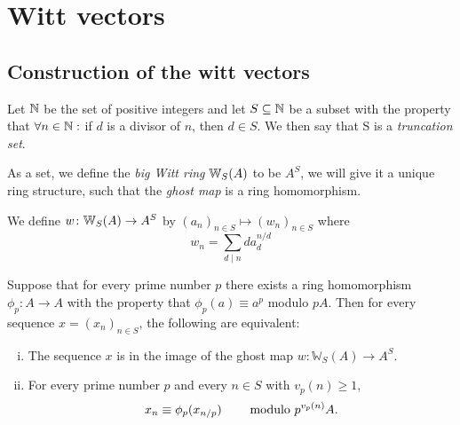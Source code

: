 \chapter{Witt vectors}
\section*{Construction of the witt vectors}
\begin{definition}
    Let $\mathbb{N}$ be the set of positive integers and let $S\subseteq
    \mathbb{N}$ be a subset with the property that $\forall n\in \mathbb{N}:$
    if $d$ is a divisor of $n$, then $d\in S$.
    We then say that S is a \textit{truncation set}.
\end{definition}
As a set, we define the \textit{big Witt ring} $\mathbb{W}_S(A)$ to be $A^S$,
we will give it a unique ring structure, such that the \textit{ghost map}
is a ring homomorphism.
\begin{definition}
    We define $w \colon \mathbb{W}_S(A) \to A^S$
    by $(a_n)_{n \in S} \mapsto (w_n)_{n \in S}$ where 
    \[
        w_n = \sum_{d \mid n} d a_d^{n/d}
    \]
\end{definition}
\begin{lemma}[Dwork]\label{lem: dwork}
    Suppose that for every prime number
$p$ there exists a ring homomorphism $\phi_p \colon A \to A$ with
the property that $\phi_p(a) \equiv a^p$ modulo $pA$. Then for every
sequence $x = (x_n)_{n \in S}$, the following 
are equivalent:
\begin{enumerate}[(i)]
\item The sequence $x$ is in the image of the ghost map
$w \colon \mathbb{W}_S(A) \to A^S.$
\item For every prime number $p$ and every $n \in S$
with $v_p(n) \geqslant 1$,
$$x_n \equiv \phi_p(x_{n/p}) \hskip8mm \text{modulo $p^{v_p(n)}A$.}$$
\end{enumerate}    
\end{lemma}
